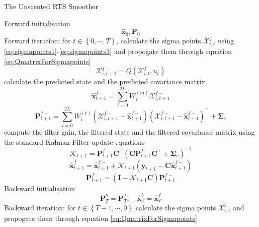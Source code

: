 \documentclass[12pt]{iopart}
\begin{document}
\begin{algorithm}
	\begin{small}
	\caption{The Unscented RTS Smoother}\label{UKFAlgorithm} 
	\begin{algorithmic}[1] 
		\State Forward initialisation 
		\begin{equation*}
		 \hat{\mathbf x}_0, \mathbf P_0 
		\end{equation*}
		\State Forward iteration: for $t \in \left\lbrace 0,\cdots, T\right\rbrace $,
		calculate the sigma points $\mathcal X_{i,t}^f$ using \ref{eq:sigmapoints1}-\ref{eq:sigmapoints3} and propogate them through equation \ref{eq:QmatrixForSigmapoints}
		\begin{equation*}
			\mathcal X_{i,t+1}^{f-}=Q(\mathcal X_{i,t}^f,u_t) 
		\end{equation*}
		calculate the predicted state and the predicted covariance matrix
		\begin{equation*}
			\hat{\mathbf x}_{t+1}^{f-}=\sum_{i=0}^{2L} W_i^{(m)}\mathcal X_{i,t+1}^{f-} 
		\end{equation*}
		\begin{equation*}
			\mathbf P_{t +1}^{f-}=\sum_{i=0}^{2L} W_i^{(c)}(\mathcal X_{i,t+1}^{f-}-\hat{\mathbf x}_{t +1}^{f-})(\mathcal X_{i,t+1}^{f-}-\hat{\mathbf x}_{t +1}^{f-})^\top+\boldsymbol \Sigma_e 
		\end{equation*}
		compute the filter gain, the filtered state and the filtered covariance matrix using the standard Kalman Filter update equations
		\begin{equation*}
			\mathcal K_{t+1}=\mathbf P_{t +1}^{f-}\mathbf C ^\top(\mathbf C \mathbf P_{t +1}^{f-}\mathbf C ^\top+\boldsymbol \Sigma_v)^{-1} 
		\end{equation*}
		\begin{equation*}
			\hat{\mathbf x}_{t+1}^{f}=\hat{\mathbf x}_{t+1}^{f-}+\mathcal K_{t+1}(\mathbf y_{t+1}-\mathbf C\hat{\mathbf x}_{t +1}^{f-}) 
		\end{equation*}
		\begin{equation*}
			\mathbf P_{t+1}^f=(\mathbf I - \mathcal K_{t+1}\mathbf C)\mathbf P_{t +1}^{f-} 
		\end{equation*}
		\State Backward initialisation 
		\begin{equation*}
			\mathbf P_T^b= \mathbf P_T^f, \quad \hat{\mathbf x}^b_T= \hat{\mathbf x}^f_T 
		\end{equation*}
		\State Backward iteration: for $t \in \left\lbrace T-1, \cdots, 0 \right\rbrace $ calculate the sigma points $\mathcal X_{i,t}^b$ and propogate them through equation \ref{eq:QmatrixForSigmapoints}

\end{algorithmic}
\end{small}
\end{algorithm}
\end{document}
